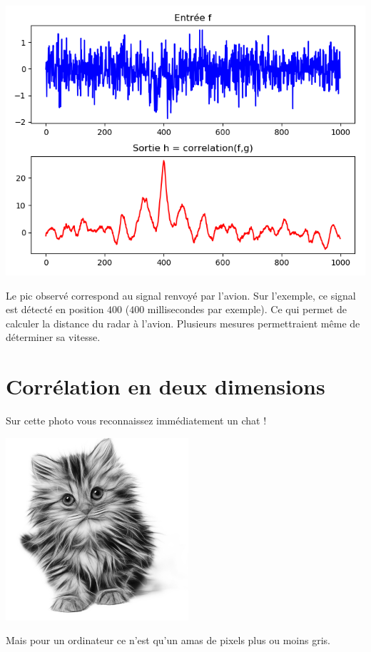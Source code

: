 \documentclass[11pt,class=report,crop=false]{standalone}
\begin{document}
\begin{center}
\includegraphics[scale=\myscale,scale=0.7]{figures/correlation1d-4}
\end{center}

Le pic observé correspond au signal renvoyé par l'avion. Sur l'exemple, ce signal est détecté en position $400$ ($400$ millisecondes par exemple). Ce qui permet de calculer la distance du radar à l'avion. Plusieurs mesures permettraient même de déterminer sa vitesse.

\section{Corrélation en deux dimensions}


Sur cette photo vous reconnaissez immédiatement un chat ! 
\begin{center}
\includegraphics[scale=\myscale,scale=0.5]{figures/chat}
\end{center}
Mais pour un ordinateur ce n'est qu'un amas de pixels plus ou moins gris.
\end{document}
